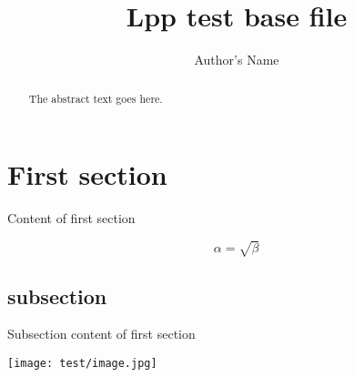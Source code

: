 \documentclass{article}
\begin{document}
\title{Lpp test base file}
\author{Author's Name}

\maketitle

\begin{abstract}
The abstract text goes here.
\end{abstract}


\section{First section}
Content of first section

\begin{equation}
    \label{simple_equation}
    \alpha = \sqrt{ \beta }
\end{equation}


\subsection{subsection}
Subsection content of first section

\texttt{[image: test/image.jpg]}
\end{document}
